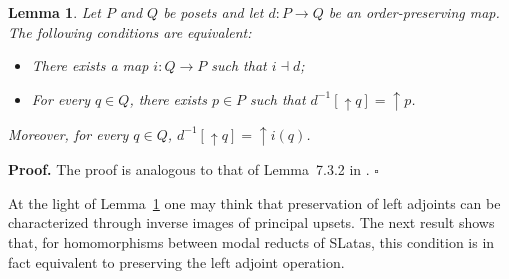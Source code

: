 \documentclass{article}
\newtheorem{lemma}{\bf Lemma}[section]
\newenvironment{proof}
{\par\noindent\textbf{Proof. }\rm}
{\hfill$\boldsymbol{\square}$\par\vspace{0.3cm}}
\begin{document}
\begin{lemma}\label{existencia izquierda}
Let $P$ and $Q$ be posets and let $d \colon P \to Q$ be an order-preserving map. The following conditions are equivalent:
\begin{itemize}
    \item[(i)] There exists a map $i \colon Q \to P$ such that $i \dashv d$;
    \item[(ii)] For every $q \in Q$, there exists $p \in P$ such that $d^{-1}[\uparrow q]=\uparrow p$.
\end{itemize}
Moreover, for every $q\in Q$, $d^{-1}[\uparrow q]=\uparrow i(q)$.
\end{lemma}

\begin{proof}
The proof is analogous to that of Lemma~7.3.2 in \cite{DP2002}.
\end{proof}

   
At the light of Lemma~\ref{existencia izquierda} one may think that preservation of left adjoints can be characterized through inverse images of principal upsets. The next result shows that, for homomorphisms between modal reducts of SLatas, this condition is in fact equivalent to preserving the left adjoint operation.
    
\end{document}
